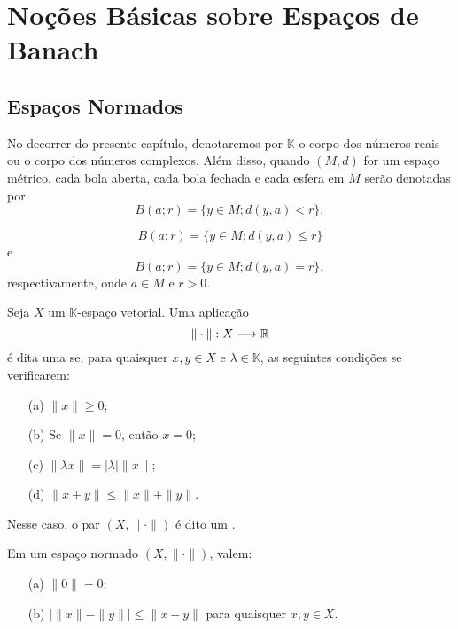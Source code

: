
\chapter{Noções Básicas sobre Espaços de Banach}

\section{Espaços Normados}

No decorrer do presente capítulo, denotaremos por $\mathbb K$ o corpo dos números reais ou o corpo dos números complexos. Além disso, quando $(M,d)$ for um espaço métrico, cada bola aberta, cada bola fechada e cada esfera em $M$ serão denotadas por
\[
\displaystyle B(a;r)=\{y\in M; d(y,a)<r\},
\]

\[
\displaystyle B(a;r)=\{y\in M; d(y,a)\leq r\}
\]
e
\[
\displaystyle B(a;r)=\{y\in M; d(y,a)=r\},
\]
respectivamente, onde $a\in M$ e $r>0$.

\begin{definition}\label{norma}
    Seja $X$ um $\mathbb K$-espaço vetorial. Uma aplicação
    \[
    \displaystyle \| \cdot \|: X\longrightarrow \mathbb{R}
    \]
    é dita uma   se, para quaisquer $x,y\in X$ e $\lambda \in \mathbb K$, as seguintes condições se verificarem:
    \begin{itemize}
    \item[(a)] $\|x\|\geq 0$;
    \item[(b)] Se $\|x\|=0$, então $x=0$;
    \item[(c)] $\|\lambda x\|=|\lambda| \|x\|$;
    \item[(d)] $\|x+y\|\leq \|x\|+\|y\|$.
    \end{itemize}
    Nesse caso, o par $(X,\|\cdot\|)$ é dito um  .
\end{definition}

\begin{remark}
Em um espaço normado $(X,\|\cdot\|)$, valem:
    \begin{itemize}
    \item[(a)] $\|0\|=0$;
    \item[(b)] $|\|x\|-\|y\|| \leq \|x-y\|$ para quaisquer $x,y \in X$.
    \end{itemize}
\end{remark}

